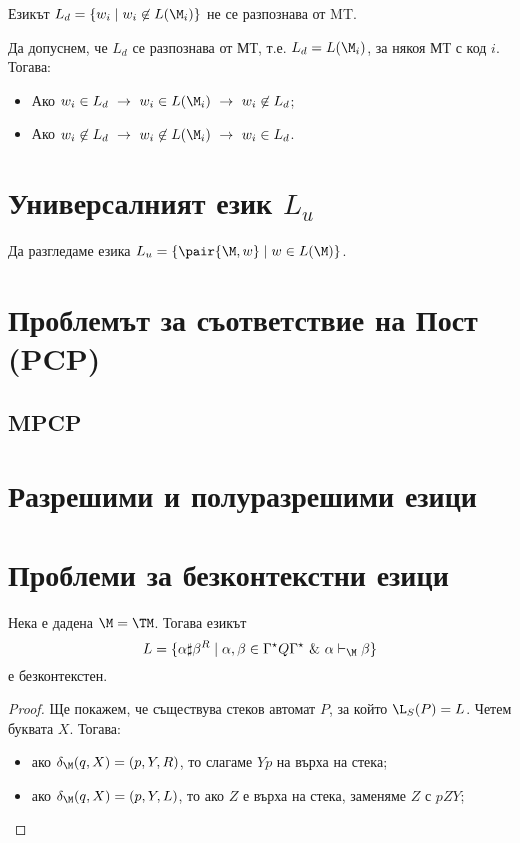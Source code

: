 \begin{framed}
  Езикът 
  $L_d = \{w_i \mid w_i \not\in L(\M_i)\}$ не се разпознава от MT.
\end{framed}
Да допуснем, че $L_d$ се разпознава от МТ, т.е. $L_d = L(\M_i)$, за някоя МТ с код $i$.
Тогава:
\begin{itemize}
\item 
  Ако
  $w_i \in L_d\ \rightarrow\ w_i \in L(\M_i)\ \rightarrow\ w_i \not\in L_d$;
\item
  Ако 
  $w_i \not\in L_d\ \rightarrow\ w_i \not\in L(\M_i)\ \rightarrow\ w_i \in L_d$.
\end{itemize}

\section{Универсалният език $L_u$}

Да разгледаме езика $L_u = \{\pair{\M,w} \mid w\in L(\M)\}$.

\section{Проблемът за съответствие на Пост (PCP)}

\subsection*{MPCP}

\section{Разрешими и полуразрешими езици}

\section{Проблеми за безконтекстни езици}

\begin{lemma}
  Нека е дадена $\M = \TM$.
  Тогава езикът 
  \[L = \{\alpha\sharp\beta^R \mid \alpha,\beta \in \Gamma^\star Q \Gamma^\star\ \&\  \alpha \vdash_\M \beta\}\]
  е безконтекстен.
\end{lemma}
\begin{proof}
  Ще покажем, че съществува стеков автомат $P$, за който $\L_S(P) = L$.
  Четем буквата $X$. Тогава:
  \begin{itemize}
  \item 
    ако $\delta_\M(q,X) =(p,Y,R)$, то слагаме $Yp$ на върха на стека;
  \item
    ако $\delta_\M(q,X) =(p,Y,L)$, то ако $Z$ е върха на стека, заменяме $Z$ с $pZY$;
  \end{itemize}
\end{proof}

